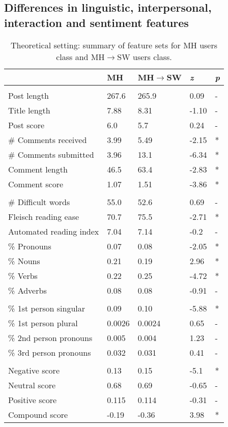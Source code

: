 \subsection{Differences in linguistic, interpersonal, interaction and sentiment features}
\begin{table}[h!]
\noindent\begin{tabularx}{\textwidth}{>{\hsize=0.4\textwidth}XXXXX}
\toprule
& MH  & MH$\rightarrow$SW & \textit{z} & \textit{p}\\
\midrule
\rowcolor{gray}
\multicolumn{5}{c}{Interaction} \\ 
Post length  & 267.6  & 265.9  & 0.09 & -\\
Title length  & 7.88  &  8.31  &  -1.10 & -\\
Post score  & 6.0 & 5.7   & 0.24 &  -\\
\# Comments received  & 3.99 & 5.49 & -2.15 & *\\
\# Comments submitted & 3.96 & 13.1 & -6.34 & *\\
Comment length & 46.5 & 63.4 & -2.83 &  * \\
Comment score & 1.07 & 1.51 & -3.86 & *\\
\rowcolor{gray}
\multicolumn{5}{c}{Linguistic structure} \\ 
\# Difficult words & 55.0 & 52.6 & 0.69 & -\\
Fleisch reading ease & 70.7 & 75.5 & -2.71 & *\\
Automated reading index & 7.04 & 7.14 & -0.2  & -\\
\% Pronouns  & 0.07 & 0.08 & -2.05  & *\\
\% Nouns & 0.21& 0.19 & 2.96  &  *\\
\% Verbs & 0.22 & 0.25 & -4.72  &  *\\
\% Adverbs & 0.08 & 0.08 & -0.91  &  -\\
\rowcolor{gray}
\multicolumn{5}{c}{Interpersonal awareness} \\ 
\% 1st person singular & 0.09 & 0.10 & -5.88 & *\\
\% 1st person plural & 0.0026 & 0.0024 & 0.65 & -\\
\% 2nd person pronouns & 0.005 & 0.004 & 1.23 &-\\
\% 3rd person pronouns & 0.032 & 0.031 & 0.41 & -\\
\rowcolor{gray}
\multicolumn{5}{c}{Sentiment analysis} \\
Negative score & 0.13 & 0.15 & -5.1 & *\\
Neutral score  & 0.68 & 0.69  & -0.65 & -\\
Positive score & 0.115 & 0.114 & -0.31 &-\\
Compound score & -0.19 & -0.36 & 3.98 & *\\
\bottomrule
\end{tabularx}
\caption{Theoretical setting: summary of feature sets for MH users class and  MH$\rightarrow$SW users class.}
\label{tab:z_test}
\end{table}
